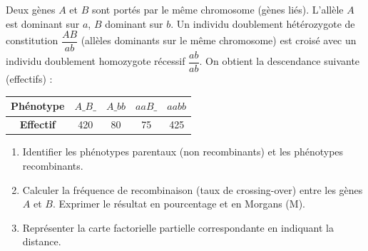 \documentclass[11pt]{article}
\begin{document}
\begin{exercice}
Deux gènes $A$ et $B$ sont portés par le même chromosome (gènes liés). L'allèle $A$ est dominant sur $a$, $B$ dominant sur $b$.
Un individu doublement hétérozygote de constitution $\dfrac{AB}{ab}$ (allèles dominants sur le même chromosome) est croisé avec un individu doublement homozygote récessif $\dfrac{ab}{ab}$.
On obtient la descendance suivante (effectifs) :
\begin{center}
\begin{tabular}{|c|c|c|c|c|}
\hline
\textbf{Phénotype} & $A\_B\_$ & $A\_bb$ & $aaB\_$ & $aabb$ \\
\hline
\textbf{Effectif} & 420 & 80 & 75 & 425 \\
\hline
\end{tabular}
\end{center}
\begin{enumerate}
    \item Identifier les phénotypes parentaux (non recombinants) et les phénotypes recombinants.
    \item Calculer la fréquence de recombinaison (taux de crossing-over) entre les gènes $A$ et $B$. Exprimer le résultat en pourcentage et en Morgans (M).
    \item Représenter la carte factorielle partielle correspondante en indiquant la distance.
\end{enumerate}
\end{exercice}
\end{document}
